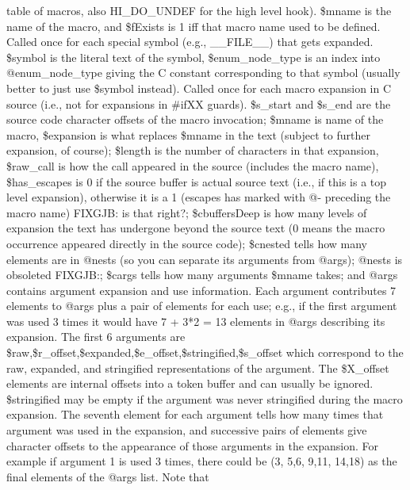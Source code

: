 table of macros,
also HI\_\-DO\_\-UNDEF for the high level hook).  \$mname is the name of the
macro, and \$fExists is 1 iff that macro name used to be defined.
Called once for each special symbol (e.g., \_\-\_\-FILE\_\-\_\-) that gets expanded.
\$symbol is the literal text of the symbol, \$enum\_\-node\_\-type is an index
into @enum\_\-node\_\-type giving the C constant corresponding to that symbol
(usually better to just use \$symbol instead).
Called once for each macro expansion in C source (i.e., not for expansions
in \#ifXX guards). \$s\_\-start and \$s\_\-end are the source code character offsets
of the macro invocation; \$mname is name of the macro, \$expansion is what
replaces \$mname in the text (subject to further expansion, of course); \$length
is the number of characters in that expansion, \$raw\_\-call is how the call
appeared in the source (includes the macro name), \$has\_\-escapes is 0 if the
source buffer is actual source text (i.e., if this is a top level expansion),
otherwise it is a 1 (escapes has marked with @- preceding the macro name)
FIXGJB: is that right?; \$cbuffersDeep is how many levels of expansion the text
has undergone beyond the source text (0 means the macro occurrence appeared
directly in the source code); \$cnested tells how many elements are in @nests
(so you can separate its arguments from @args); @nests is obsoleted FIXGJB:;
\$cargs tells how many arguments \$mname takes; and @args contains argument
expansion and use information.  Each argument contributes 7 elements to @args
plus a pair of elements for each use;  e.g., if the first argument was used 3 times
it would have 7 + 3*2 = 13 elements in @args describing its expansion.  The
first 6 arguments are \$raw,\$r\_\-offset,\$expanded,\$e\_\-offset,\$stringified,\$s\_\-offset
which correspond to the raw, expanded, and stringified representations of the
argument.  The \$X\_\-offset elements are internal offsets into a token buffer
and can usually be ignored.  \$stringified may be empty if the argument was
never stringified during the macro expansion.  The seventh element for each
argument tells how many times that argument was used in the expansion, and
successive pairs of elements give character offsets to the appearance of those
arguments in the expansion.  For example if argument 1 is used 3 times, there could
be (3, 5,6, 9,11,  14,18) as the final elements of the @args list.  Note that
